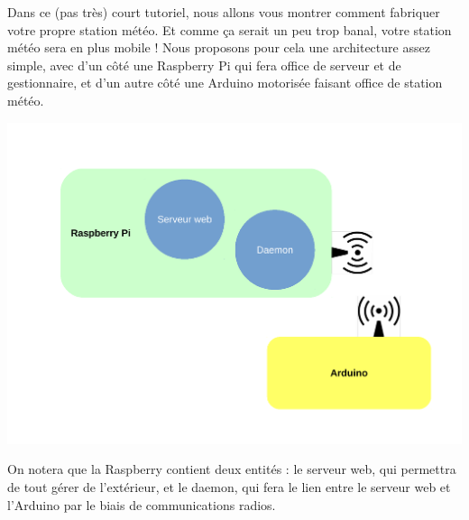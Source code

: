 Dans ce (pas très) court tutoriel, nous allons vous montrer comment 
fabriquer votre propre station météo. Et comme ça serait un peu trop banal, 
votre station météo sera en plus mobile ! Nous proposons pour cela une
architecture assez simple, avec d'un côté une Raspberry Pi qui fera office de
serveur et de gestionnaire, et d'un autre côté une Arduino motorisée faisant
office de station météo.

\includegraphics[width=\textwidth]{include/archi.pdf}

On notera que la Raspberry contient deux entités : le serveur web, qui permettra
de tout gérer de l'extérieur, et le daemon, qui fera le lien entre le serveur 
web et l'Arduino par le biais de communications radios.
